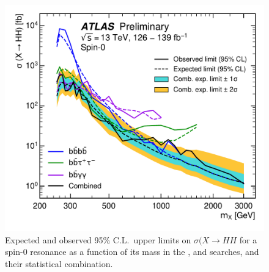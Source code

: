 
\begin{figure}[htbp]
\centering
\includegraphics[height=0.45\textheight]{DiHiggs/plots/upperlimit_xsec_spin0_json_obs_fullcorr.pdf}
\caption{Expected and observed 95\% C.L.\ upper limits on $\sigma(X \rightarrow HH$ 
for a spin-0 resonance as a function of its mass \mX in the \bbyy, \bbtt and \bbbb searches, 
and their statistical combination. 
}
\label{fig:spin0_obs_limits}
\end{figure}
